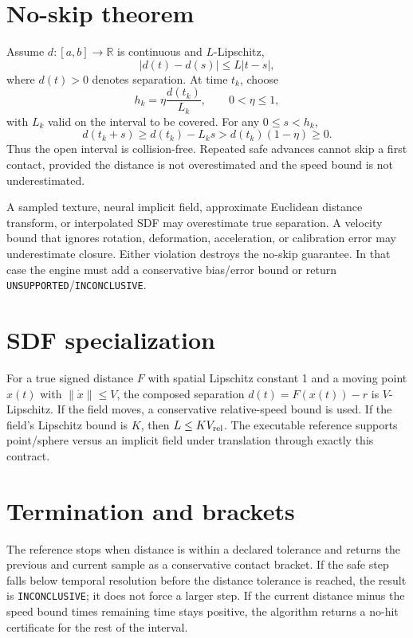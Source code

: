 \documentclass[11pt,a4paper,openany]{book}
\newcommand{\status}[1]{\texttt{#1}}
\newcommand{\R}{\mathbb{R}}
\begin{document}
\section{No-skip theorem}
Assume $d:[a,b]\rightarrow\R$ is continuous and $L$-Lipschitz,
\begin{equation}
 |d(t)-d(s)|\le L|t-s|,
\end{equation}
where $d(t)>0$ denotes separation. At time $t_k$, choose
\begin{equation}
 h_k=\eta\frac{d(t_k)}{L_k},\qquad 0<\eta\le 1,
\end{equation}
with $L_k$ valid on the interval to be covered. For any $0\le s<h_k$,
\begin{equation}
 d(t_k+s)\ge d(t_k)-L_ks > d(t_k)(1-\eta)\ge 0.
\end{equation}
Thus the open interval is collision-free. Repeated safe advances cannot skip a first contact, provided the distance is not overestimated and the speed bound is not underestimated.

\begin{warningbox}
A sampled texture, neural implicit field, approximate Euclidean distance transform, or interpolated SDF may overestimate true separation. A velocity bound that ignores rotation, deformation, acceleration, or calibration error may underestimate closure. Either violation destroys the no-skip guarantee. In that case the engine must add a conservative bias/error bound or return \status{UNSUPPORTED}/\status{INCONCLUSIVE}.
\end{warningbox}

\section{SDF specialization}
For a true signed distance $F$ with spatial Lipschitz constant 1 and a moving point $x(t)$ with $\|\dot x\|\le V$, the composed separation $d(t)=F(x(t))-r$ is $V$-Lipschitz. If the field moves, a conservative relative-speed bound is used. If the field's Lipschitz bound is $K$, then $L\le K V_{\rm rel}$. The executable reference supports point/sphere versus an implicit field under translation through exactly this contract.

\section{Termination and brackets}
The reference stops when distance is within a declared tolerance and returns the previous and current sample as a conservative contact bracket. If the safe step falls below temporal resolution before the distance tolerance is reached, the result is \status{INCONCLUSIVE}; it does not force a larger step. If the current distance minus the speed bound times remaining time stays positive, the algorithm returns a no-hit certificate for the rest of the interval.
\end{document}
